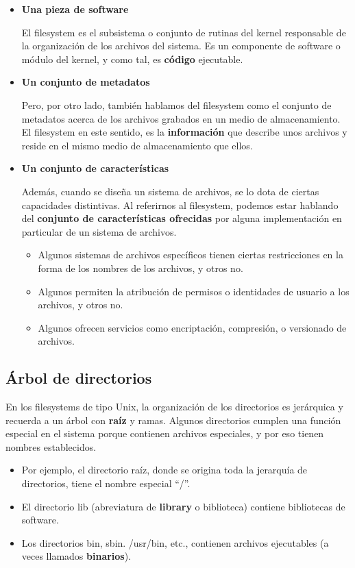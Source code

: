 \documentclass[spanish,a4paper,]{article}
\providecommand{\tightlist}{%
  \setlength{\itemsep}{0pt}\setlength{\parskip}{0pt}}
\begin{document}
\begin{itemize}
\item
  \textbf{Una pieza de software}

  El filesystem es el subsistema o conjunto de rutinas del kernel
  responsable de la organización de los archivos del sistema. Es un
  componente de software o módulo del kernel, y como tal, es
  \textbf{código} ejecutable.
\item
  \textbf{Un conjunto de metadatos}

  Pero, por otro lado, también hablamos del filesystem como el conjunto
  de metadatos acerca de los archivos grabados en un medio de
  almacenamiento. El filesystem en este sentido, es la
  \textbf{información} que describe unos archivos y reside en el mismo
  medio de almacenamiento que ellos.
\item
  \textbf{Un conjunto de características}

  Además, cuando se diseña un sistema de archivos, se lo dota de ciertas
  capacidades distintivas. Al referirnos al filesystem, podemos estar
  hablando del \textbf{conjunto de características ofrecidas} por alguna
  implementación en particular de un sistema de archivos.

  \begin{itemize}
  \tightlist
  \item
    Algunos sistemas de archivos específicos tienen ciertas
    restricciones en la forma de los nombres de los archivos, y otros
    no.
  \item
    Algunos permiten la atribución de permisos o identidades de usuario
    a los archivos, y otros no.
  \item
    Algunos ofrecen servicios como encriptación, compresión, o
    versionado de archivos.
  \end{itemize}
\end{itemize}

\hypertarget{uxe1rbol-de-directorios}{%
\subsection{Árbol de directorios}\label{uxe1rbol-de-directorios}}

En los filesystems de tipo Unix, la organización de los directorios es
jerárquica y recuerda a un árbol con \textbf{raíz} y ramas. Algunos
directorios cumplen una función especial en el sistema porque contienen
archivos especiales, y por eso tienen nombres establecidos.

\begin{itemize}
\tightlist
\item
  Por ejemplo, el directorio raíz, donde se origina toda la jerarquía de
  directorios, tiene el nombre especial ``/''.
\item
  El directorio lib (abreviatura de \textbf{library} o biblioteca)
  contiene bibliotecas de software.
\item
  Los directorios bin, sbin. /usr/bin, etc., contienen archivos
  ejecutables (a veces llamados \textbf{binarios}).
\end{itemize}
\end{document}
